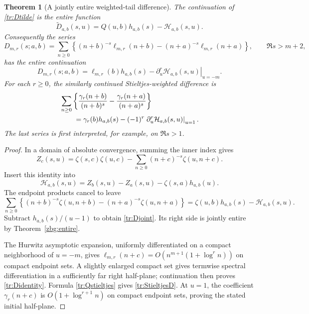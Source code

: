 \documentclass[11pt,letterpaper]{article}
\numberwithin{equation}{section}
\theoremstyle{plain}
\newtheorem{theorem}{Theorem}[section]
\theoremstyle{definition}
\theoremstyle{remark}
\newcommand{\HH}{\mathcal H}
\begin{document}
\begin{theorem}[A jointly entire weighted-tail difference]
\label{tr:jointD}
The continuation of \eqref{tr:Dtilde} is the entire function
\begin{equation}\label{tr:Djoint}
 \boxed{\widetilde D_{a,b}(s,u)
       =Q(u,b)h_{a,b}(s)-\HH_{a,b}(s,u).}
\end{equation}
Consequently the series
\begin{equation}\label{tr:D}
 D_{m,r}(s;a,b)=\sum_{n\geq0}\left\{
 (n+b)^{-s}\ell_{m,r}(n+b)
 -(n+a)^{-s}\ell_{m,r}(n+a)\right\},
 \qquad \Re s>m+2,
\end{equation}
has the entire continuation
\begin{equation}\label{tr:Didentity}
 D_{m,r}(s;a,b)=\ell_{m,r}(b)h_{a,b}(s)
       -\left.\partial_u^r\HH_{a,b}(s,u)\right|_{u=-m}.
\end{equation}
For each $r\geq0$, the similarly continued Stieltjes-weighted difference is
\begin{align}
 &\sum_{n\geq0}\left\{
 \frac{\gamma_r(n+b)}{(n+b)^s}
 -\frac{\gamma_r(n+a)}{(n+a)^s}\right\}
 \notag\\
 &\qquad=\gamma_r(b)h_{a,b}(s)
       -(-1)^r\left.\partial_u^r\HH_{a,b}(s,u)\right|_{u=1}.
 \label{tr:StieltjesD}
\end{align}
The last series is first interpreted, for example, on $\Re s>1$.
\end{theorem}

\begin{proof}
In a domain of absolute convergence, summing the inner index gives
\[
 Z_c(s,u)=\zeta(s,c)\zeta(u,c)
          -\sum_{n\geq0}(n+c)^{-s}\zeta(u,n+c).
\]
Insert this identity into
\[
 \HH_{a,b}(s,u)=Z_b(s,u)-Z_a(s,u)-\zeta(s,a)h_{a,b}(u).
\]
The endpoint products cancel to leave
\[
 \sum_{n\geq0}\left\{(n+b)^{-s}\zeta(u,n+b)
               -(n+a)^{-s}\zeta(u,n+a)\right\}
 =\zeta(u,b)h_{a,b}(s)-\HH_{a,b}(s,u).
\]
Subtract $h_{a,b}(s)/(u-1)$ to obtain \eqref{tr:Djoint}.
Its right side is jointly entire by Theorem~\ref{zbg:entire}.

The Hurwitz asymptotic expansion, uniformly differentiated on a compact
neighborhood of $u=-m$, gives
$\ell_{m,r}(n+c)=O(n^{m+1}(1+\log^r n))$ on compact endpoint sets.
A slightly enlarged compact set gives termwise spectral differentiation
in a sufficiently far right half-plane; continuation then proves
\eqref{tr:Didentity}. Formula \eqref{tr:Qstieltjes} gives
\eqref{tr:StieltjesD}. At $u=1$, the coefficient $\gamma_r(n+c)$ is
$O(1+\log^{r+1}n)$ on compact endpoint sets, proving the stated
initial half-plane.
\end{proof}
\end{document}

